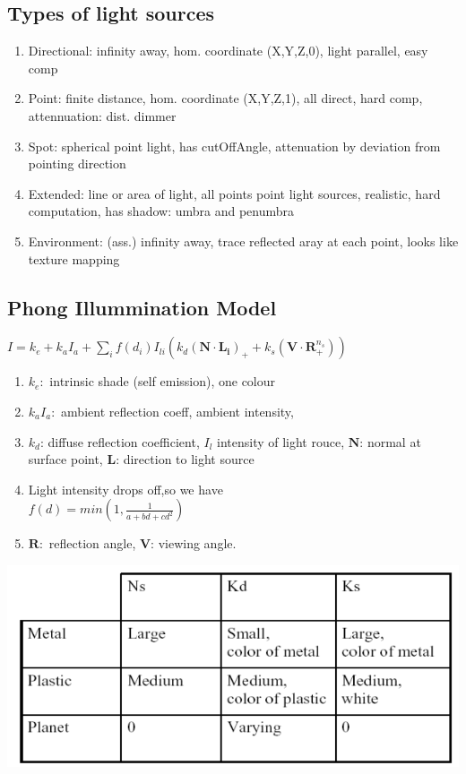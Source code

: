 \documentclass[a4paper]{article}
\begin{document}
\subsection*{Types of light sources}
\begin{enumerate}
	\item Directional: infinity away, hom. coordinate (X,Y,Z,0), light parallel, easy comp
	\item Point: finite distance, hom. coordinate (X,Y,Z,1), all direct, hard comp, attennuation: dist. dimmer 
	\item Spot: spherical point light, has cutOffAngle, attenuation by deviation from pointing direction
	\item Extended: line or area of light, all points point light sources, realistic, hard computation, has shadow: umbra and penumbra
	\item Environment: (ass.) infinity away, trace reflected aray at each point, looks like texture mapping 
\end{enumerate}

\subsection{Phong Illummination Model}
$I = k_e + k_aI_a + \sum_i f(d_i)I_{li}(k_d(\mathbf{N\cdot L_i})_+ + k_s(\mathbf{V\cdot R}_+^{n_s}))$ 
\begin{enumerate}
	\item $k_e:$ intrinsic shade (self emission), one colour
	\item $k_aI_a:$ ambient reflection coeff, ambient intensity,
	\item $k_d$: diffuse reflection coefficient, $I_l$ intensity of light rouce, $\mathbf{N}$: normal at surface point, $\mathbf{L}$: direction to light source
	\item Light intensity drops off,so we have \\ $f(d)=min(1, \frac{1}{a+bd+cd^2})$ 
	\item $\mathbf{R}:$ reflection angle, $\mathbf{V}$: viewing angle. 
\end{enumerate}
\includegraphics[scale=0.3]{Screenshot_1.png}
\end{document}
